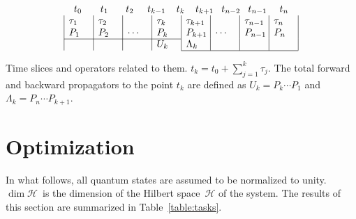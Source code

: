 \documentclass[aps, pra, a4paper, longbibliography]{revtex4}
\newcommand{\hilb}[1]{\mathcal{#1}}
\begin{document}
\begin{table}[h]
\label{table:slices}
\[
\begin{array}{c}
\begin{array}{@{t_0}p{1.9em}@{t_1}p{1.8em}@{t_2}p{1.4em}@{t_{k-1}}p{1.1em}@{t_{k}}p{1.1em}@{t_{k+1}}p{0.8em}@{t_{n-2}}p{0.8em}@{t_{n-1}}p{1.3em}@{t_n}}
& & & & & & &
\end{array}\\
\begin{array}{|p{2em}|p{2em}|p{2em}|p{2em}|p{2em}|p{2em}|p{2em}|p{2em}|}
 $\tau_1$ & $\tau_2$ & & $\tau_k$ & $\tau_{k+1}$ & & $\tau_{n-1}$ & $\tau_n$ \\
 $P_1$ & $P_2$ & $\cdots$ & $P_k$ & $P_{k+1}$ & $\cdots$ & $P_{n-1}$ & $P_n$ \\
\cline{1-4}
& & & $U_{k}$ & $\Lambda_{k}$ & & & \\
\cline{5-8}
\end{array}
\end{array}
\]
\caption{Time slices and operators related to them.
$t_k = t_0 + \sum_{j=1}^{k} \tau_j$.
The total forward and backward
propagators to the point $t_k$ are defined as
$U_k = P_k \cdots P_1$ and
$\Lambda_k = P_{n} \cdots P_{k+1}$.}
\end{table}








\section{Optimization}

In what follows, all quantum states are assumed to be normalized to
unity. $\dim \hilb{H}$~is the dimension of the Hilbert space~$\hilb{H}$ of the system.
The results of this section are summarized in Table~\ref{table:tasks}.
\end{document}
